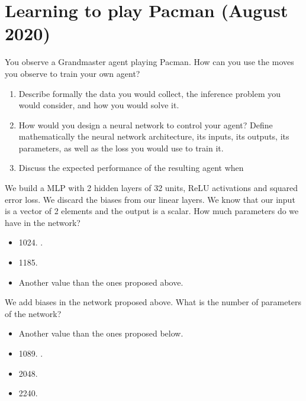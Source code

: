 \documentclass[11pt, a4paper]{article}
\begin{document}
\newpage

\section{Learning to play Pacman (August 2020)}

You observe a Grandmaster agent playing Pacman. How can you use the moves you observe to train your own agent?

\begin{enumerate}
    \item Describe formally the data you would collect, the inference problem you would consider, and how you would solve it.

    \item How would you design a neural network to control your agent? Define mathematically the neural network architecture, its inputs, its outputs, its parameters, as well as the loss you would use to train it.

    \item Discuss the expected performance of the resulting agent when 
\end{enumerate}

\newpage

\newpage

\startquiz

We build a MLP with 2 hidden layers of 32 units, ReLU activations and squared error loss. We discard the biases from our linear layers. We know that our input is a vector of 2 elements and the output is a scalar. How much parameters do we have in the network?
\begin{itemize}
    \item 1024.
    .
    \item 1185.
    \item Another value than the ones proposed above.
\end{itemize}

We add biases in the network proposed above. What is the number of parameters of the network?
\begin{itemize}
    \item Another value than the ones proposed below.
    \item 1089.
    .
    \item 2048.
    \item 2240.
\end{itemize}
\end{document}
